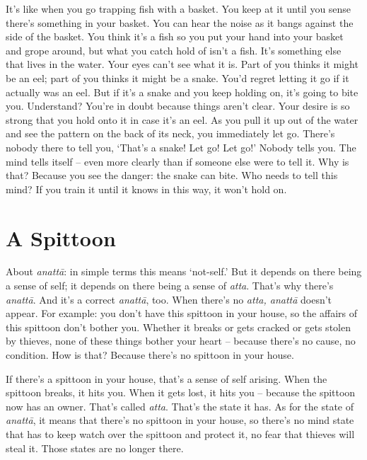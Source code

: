 It's like when you go trapping fish with a basket. You keep at it until you sense there's something in your basket. You can hear the noise as it bangs against the side of the basket. You think it's a fish so you put your hand into your basket and grope around, but what you catch hold of isn't a fish. It's something else that lives in the water. Your eyes can't see what it is. Part of you thinks it might be an eel; part of you thinks it might be a snake. You'd regret letting it go if it actually was an eel. But if it's a snake and you keep holding on, it's going to bite you. Understand? You're in doubt because things aren't clear. Your desire is so strong that you hold onto it in case it's an eel. As you pull it up out of the water and see the pattern on the back of its neck, you immediately let go. There's nobody there to tell you, `That's a snake! Let go! Let go!' Nobody tells you. The mind tells itself -- even more clearly than if someone else were to tell it. Why is that? Because you see the danger: the snake can bite. Who needs to tell this mind? If you train it until it knows in this way, it won't hold on.

\clearpage

\section{A Spittoon}

About \textit{anatt\=a}: in simple terms this means `not-self.' But it depends on there being a sense of self; it depends on there being a sense of \textit{atta}. That's why there's \textit{anatt\=a}. And it's a correct \textit{anatt\=a}, too. When there's no \textit{atta, anatt\=a} doesn't appear. For example: you don't have this spittoon in your house, so the affairs of this spittoon don't bother you. Whether it breaks or gets cracked or gets stolen by thieves, none of these things bother your heart -- because there's no cause, no condition. How is that? Because there's no spittoon in your house.

If there's a spittoon in your house, that's a sense of self arising. When the spittoon breaks, it hits you. When it gets lost, it hits you -- because the spittoon now has an owner. That's called \textit{atta}. That's the state it has. As for the state of \textit{anatt\=a}, it means that there's no spittoon in your house, so there's no mind state that has to keep watch over the spittoon and protect it, no fear that thieves will steal it. Those states are no longer there. 


